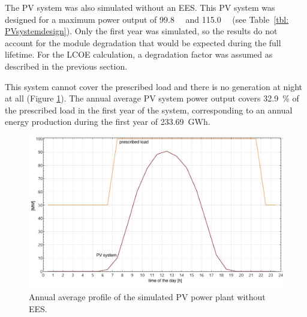 The PV system was also simulated without an EES. This PV system was designed for a maximum power output of \SI{99.8}{\mega\wattsac} and \SI{115.0}{\mega\wattsdc} (see Table~\ref{tbl: PVsystemdesign}). Only the first year was simulated, so the results do not account for the module degradation that would be expected during the full lifetime. For the LCOE calculation, a degradation factor was assumed as described in the previous section. 


This system cannot cover the prescribed load and there is no generation at night at all (Figure \ref{PVwithoutEESanual}). The annual average PV system power output covers \SI{32.9}{\percent} of the prescribed load in the first year of the system, corresponding to an annual energy production during the first year of \SI{233.69}{GWh}.


\begin{figure}[htbp]  
\centering
\includegraphics[width=0.8\linewidth]{FIG/PVwithoutEESanual}
\caption[Annual average profile of the simulated PV power plant without EES.]{Annual average profile of the simulated PV power plant without EES.}\label{PVwithoutEESanual}
\end{figure}


